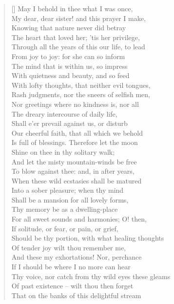 \documentclass[MAIN]{subfiles}
\begin{document}
\begin{verse}[\versewidth]
May I behold in thee what I was once,\\
My dear, dear sister! and this prayer I make,\\ 
Knowing that nature never did betray\\
The heart that loved her; 'tis her privilege,\\ 
Through all the years of this our life, to lead\\ 
From joy to joy: for she can so inform\\
The mind that is within us, so impress\\
With quietness and beauty, and so feed\\
With lofty thoughts, that neither evil tongues,\\
Rash judgments, nor the sneers of selfish men,\\
Nor greetings where no kindness is, nor all\\
The dreary intercourse of daily life,\\
Shall e'er prevail against us, or disturb\\
Our cheerful faith, that all which we behold\\
Is full of blessings. Therefore let the moon\\
Shine on thee in thy solitary walk;\\
And let the misty mountain-winds be free\\
To blow against thee: and, in after years,\\ 
When these wild ecstasies shall be matured\\
Into a sober pleasure; when thy mind\\
Shall be a mansion for all lovely forms,\\
Thy memory be as a dwelling-place\\
For all sweet sounds and harmonies; O! then,\\ 
If solitude, or fear, or pain, or grief,\\
Should be thy portion, with what healing thoughts\\
Of tender joy wilt thou remember me,\\
And these my exhortations! Nor, perchance\\ 
If I should be where I no more can hear\\
Thy voice, nor catch from thy wild eyes these gleams\\ 
Of past existence -- wilt thou then forget\\
That on the banks of this delightful stream\\

\end{verse}
\end{document}
